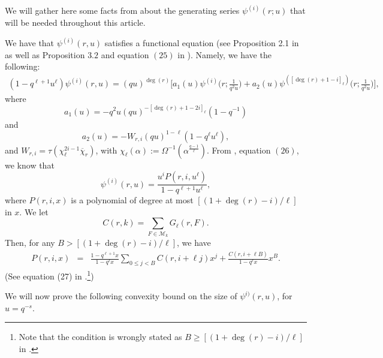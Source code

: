 \documentclass[12pt]{amsart}
\begin{document}
We will gather here some facts from \cite{DFL} about  the generating series $\psi^{(i)}(r; u)$ that will be needed throughout this article.

We have that $\psi^{(i)}(r,u)$ satisfies a functional equation (see Proposition 2.1 in \cite{hoffstein} as well as Proposition $3.2$ and equation $(25)$ in \cite{DFL}). Namely, we have the following:
\begin{align}
\label{funct_eq}
(1-q^{\ell+1} u^{\ell}) \psi^{(i)}(r,u) =(qu)^{\deg(r)}\Big[a_1(u) \psi^{(i)} \Big(r; \frac{1}{q^2u} \Big)+a_2(u) \psi^{([\deg(r)+1-i]_{\ell})}\Big( r;  \frac{1}{q^2u} \Big) \Big],
\end{align}
where $$a_1(u) = -q^2u (qu)^{-[\deg(r)+1-2i]_{\ell}}(1-q^{-1})$$ and $$a_2(u)= -W_{r,i} (qu)^{1-\ell} (1-q^{\ell} u^{\ell}),$$
and $W_{r,i}=\tau(\chi_\ell^{2i-1}\overline{\chi}_r)$, with $\chi_\ell(\alpha):=\Omega^{-1}(\alpha^\frac{q-1}{\ell})$.
From \cite{DFL}, equation $(26)$, we know that
\begin{equation}
\label{psi-formula}
\psi^{(i)}(r,u) = \frac{u^i P(r,i,u^{\ell})}{1-q^{\ell+1} u^{\ell}},
\end{equation} where 
$P(r,i,x)$ is a polynomial of degree at most $[(1+\deg(r)-i)/\ell]$ in $x$.
We let 
\begin{equation}C(r, k) = \sum_{F \in \mathcal{M}_{k}} G_{\ell}(r, F).\label{ccoeff}
\end{equation}
Then, for any $B > [(1+\deg(r)-i)/\ell]$, we have
\begin{eqnarray}
 P(r,  i, x) 
\label{formula-for-P}
&=& \frac{1-q^{\ell+1}x}{1-q^{\ell}x}  \sum_{0 \leq j < B} C(r, i+\ell j) x^j +  \frac{C(r, i + \ell B)}{1-q^{\ell}x} x^{B}.
\end{eqnarray}
(See equation (27) in \cite{DFL}.\footnote{Note that the condition is wrongly stated as $B \geq [(1+\deg(r)-i)/\ell]$ in \cite{DFL}.})


We will now prove the following convexity bound on the size of $\psi^{i)}(r,u)$, for $u=q^{-s}$.
\end{document}
